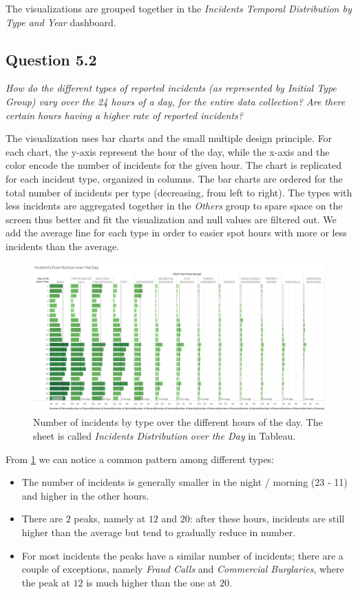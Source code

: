 The visualizations are grouped together in the \textit{Incidents Temporal Distribution by Type and Year} dashboard.


\subsection*{Question 5.2}
\textit{How do the different types of reported incidents (as represented by Initial Type Group) vary over the 24 hours of a day, for the entire data collection? Are there certain hours having a higher rate of reported incidents?}

The visualization uses bar charts and the small multiple design principle.
For each chart, the y-axis represent the hour of the day, while the x-axis and the color encode the number of incidents for the given hour.
The chart is replicated for each incident type, organized in columns.
The bar charts are ordered for the total number of incidents per type (decreasing, from left to right).
The types with less incidents are aggregated together in the \textit{Others} group to spare space on the screen thus better and fit the visualization and null values are filtered out.
We add the average line for each type in order to easier spot hours with more or less incidents than the average.

\begin{figure}[h]
	\centering
	\includegraphics[width=\columnwidth]{figures/5_2_incidents_by_type_and_hour}
	\caption{Number of incidents by type over the different hours of the day. The sheet is called \textit{Incidents Distribution over the Day} in Tableau.}
	\label{fig:5_2_incidents_by_type_and_hour}
\end{figure}

From \cref{fig:5_2_incidents_by_type_and_hour} we can notice a common pattern among different types:
\begin{itemize}
	\item The number of incidents is generally smaller in the night / morning (23 - 11) and higher in the other hours.
	\item There are $2$ peaks, namely at $12$ and $20$: after these hours, incidents are still higher than the average but tend to gradually reduce in number.
	\item For most incidents the peaks have a similar number of incidents; there are a couple of exceptions, namely \textit{Fraud Calls} and \textit{Commercial Burglaries}, where the peak at $12$ is much higher than the one at $20$. 
\end{itemize}

